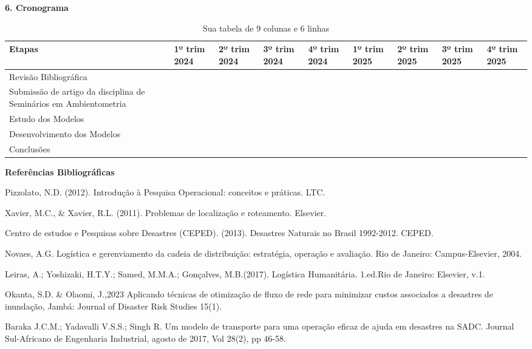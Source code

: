 \documentclass[
]{article}
\begin{document}
\textbf{6. Cronograma}

\begin{table}[ht]
\centering
\begin{tabular}{|p{3cm}|p{1.5cm}|p{1.5cm}|p{1.5cm}|p{1.5cm}|p{1.5cm}|p{1.5cm}|p{1.5cm}|p{1.5cm}|}
\hline
Etapas & 1º trim 2024 & 2º trim 2024 & 3º trim 2024 & 4º trim 2024 & 1º trim 2025 & 2º trim 2025 & 3º trim 2025 & 4º trim 2025 \\ \hline
Revisão Bibliográfica   &    &    &    &    &    &    &    &    \\ \hline
Submissão de artigo da
disciplina de Seminários
em Ambientometria   &    &    &    &    &    &    &    &    \\ \hline
Estudo dos Modelos   &    &    &    &    &    &    &    &    \\ \hline
Desenvolvimento dos Modelos &    &    &    &    &    &    &    &    \\ \hline
Conclusões   &    &    &    &    &    &    &    &    \\ \hline
\end{tabular}
\caption{Sua tabela de 9 colunas e 6 linhas}
\end{table}

\newpage

\textbf{Referências Bibliográficas}

Pizzolato, N.D. (2012). Introdução à Pesquisa Operacional: conceitos e
práticas. LTC.

Xavier, M.C., \& Xavier, R.L. (2011). Problemas de localização e
roteamento. Elsevier.

Centro de estudos e Pesquisas sobre Desastres (CEPED). (2013). Desastres
Naturais no Brasil 1992-2012. CEPED.

Novaes, A.G. Logística e gerenviamento da cadeia de distribuição:
estratégia, operação e avaliação. Rio de Janeiro: Campus-Elsevier, 2004.

Leiras, A.; Yoshizaki, H.T.Y.; Samed, M.M.A.; Gonçalves, M.B.(2017).
Logística Humanitária. 1.ed.Rio de Janeiro: Elsevier, v.1.

Okanta, S.D. \& Olaomi, J.,2023 Aplicando técnicas de otimização de
fluxo de rede para minimizar custos associados a desastres de inundação,
Jambá: Journal of Disaster Risk Studies 15(1).

Baraka J.C.M.; Yadavalli V.S.S.; Singh R. Um modelo de transporte para
uma operação eficaz de ajuda em desastres na SADC. Journal Sul-Africano
de Engenharia Industrial, agosto de 2017, Vol 28(2), pp 46-58.
\end{document}

